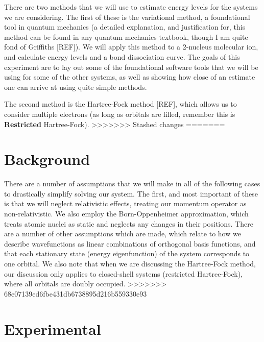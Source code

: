 \documentclass[journal=jacsat,manuscript=communication]{achemso}
\begin{document}
There are two methods that we will use to estimate energy levels for the systems we are considering.  The first of these is the variational method, a foundational tool in quantum mechanics (a detailed explanation, and justification for, this method can be found in any quantum mechanics textbook, though I am quite fond of Griffiths [REF]).  We will apply this method to a 2-nucleus  molecular ion, and calculate energy levels and a bond dissociation curve.  The goals of this experiment are to lay out some of the foundational software tools that we will be using for some of the other systems, as well as showing how close of an estimate one can arrive at using quite simple methods.

The second method is the Hartree-Fock method [REF], which allows us to consider multiple electrons (as long as orbitals are filled, remember this is \textbf{Restricted} Hartree-Fock).  
>>>>>>> Stashed changes
=======
\section{Background}
There are a number of assumptions that we will make in all of the following cases to drastically simplify solving our system.  The first, and most important of these is that we will neglect relativistic effects, treating our momentum operator as non-relativistic.  We also employ the Born-Oppenheimer approximation, which treats atomic nuclei as static and neglects any changes in their positions.  There are a number of other assumptions which are made, which relate to how we describe wavefunctions as linear combinations of orthogonal basis functions, and that each stationary state (energy eigenfunction) of the system corresponds to one orbital.  We also note that when we are discussing the Hartree-Fock method, our discussion only applies to closed-shell systems (restricted Hartree-Fock), where all orbitals are doubly occupied. 
>>>>>>> 68e07139ed6fbe431db6738895d216b559330e93
\section{Experimental}
\end{document}
